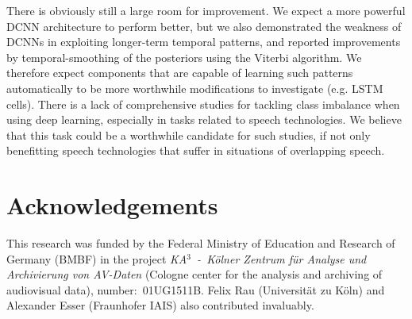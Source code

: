 \documentclass[a4paper]{article}
\begin{document}
There is obviously still a large room for improvement.
We expect a more powerful DCNN architecture to perform better,
but we also demonstrated the weakness of DCNNs in exploiting longer-term temporal patterns,
and reported improvements by temporal-smoothing of the posteriors using the Viterbi algorithm.
We therefore expect components that are capable of learning such patterns automatically to be more worthwhile modifications to investigate (e.g. LSTM cells).
There is a lack of comprehensive studies for tackling class imbalance when using deep learning,
especially in tasks related to speech technologies.
We believe that this task could be a worthwhile candidate for such studies,
if not only benefitting speech technologies that suffer in situations of overlapping speech.

\section{Acknowledgements}
This research was funded by the Federal Ministry of Education and Research of Germany (BMBF) in the project \textit{KA$^3$~-~K{\"o}lner Zentrum für Analyse und Archivierung von AV-Daten} (Cologne center for the analysis and archiving of audiovisual data), number:~01UG1511B.
Felix Rau (Universit{\"a}t zu K{\"o}ln) and Alexander Esser (Fraunhofer IAIS) also contributed invaluably.



\end{document}
